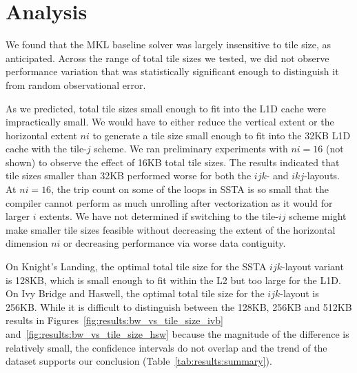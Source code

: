 \documentclass[10pt, conference, compsocconf]{IEEEtran}
\begin{document}
\section{Analysis}
\label{sec:results:analysis}

We found that the MKL baseline solver was largely insensitive to tile size, as
  anticipated.
Across the range of total tile sizes we tested, we did not observe performance
  variation that was statistically significant enough to distinguish it from
  random observational error.

As we predicted, total tile sizes small enough to fit into the L1D cache were
  impractically small.
We would have to either reduce the vertical extent or the horizontal
  extent \(ni\) to generate a tile size small enough to fit into the 32KB L1D
  cache with the tile-\(j\) scheme.
We ran preliminary experiments with \(ni=16\) (not shown) to observe the effect
  of 16KB total tile sizes.
The results indicated that tile sizes smaller than 32KB performed worse for both
  the \(ijk\)- and \(ikj\)-layouts.
At \(ni=16\), the trip count on some of the loops in SSTA is so small that the
  compiler cannot perform as much unrolling after vectorization as it would for
  larger \(i\) extents.
We have not determined if switching to the tile-\(ij\) scheme might make
  smaller tile sizes feasible without decreasing the extent of the horizontal
  dimension \(ni\) or decreasing performance via worse data contiguity.


On Knight's Landing, the optimal total tile size for the SSTA \(ijk\)-layout
  variant is 128KB, which is small enough to fit within the L2 but too large
  for the L1D. 
On Ivy Bridge and Haswell, the optimal total tile size for the \(ijk\)-layout 
  is 256KB.
While it is difficult to distinguish between the 128KB, 256KB and 512KB results
  in Figures~\ref{fig:results:bw_vs_tile_size_ivb} and~\ref{fig:results:bw_vs_tile_size_hsw}
  because the magnitude of the difference is relatively small, the confidence
  intervals do not overlap and the trend of the dataset supports our conclusion
  (Table~\ref{tab:results:summary}).
\end{document}
